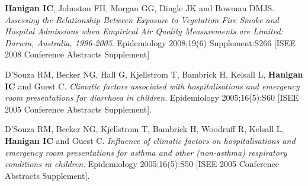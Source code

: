 \documentclass[a4paper,11pt]{article}
\begin{document}
%
{}
\medskip
\renewcommand{\labelenumi}{\textsc{c}\theenumi.}
\begin{revnumerate}

\item \textbf{Hanigan IC}, Johnston FH, Morgan GG, Dingle JK and Bowman DMJS.  \emph{Assessing the Relationship Between Exposure to Vegetation Fire Smoke and Hospital Admissions when Empirical Air Quality Measurements are Limited: Darwin, Australia, 1996-2005}.  Epidemiology 2008;19(6) Supplement:S266 [ISEE 2008 Conference Abstracts Supplement]

\item D'Souza RM, Becker NG, Hall G, Kjellstrom T, Bambrick H, Kelsall L, \textbf{Hanigan IC} and Guest C. \emph{Climatic factors associated with hospitalisations and emergency room presentations for diarrhoea in children}. Epidemiology 2005;16(5):S60 [ISEE 2005 Conference Abstracts Supplement].

\item D'Souza RM, Becker NG, Kjellstrom T, Bambrick H, Woodruff R, Kelsall L, \textbf{Hanigan IC} and Guest C. \emph{Influence of climatic factors on hospitalisations and emergency room presentations for asthma and other (non-asthma) respiratory conditions in children}. Epidemiology 2005;16(5):S50 [ISEE 2005 Conference Abstracts Supplement].

\end{revnumerate}
\end{document}
